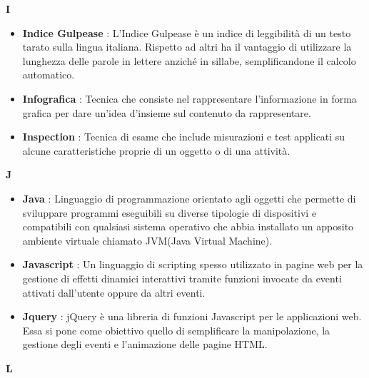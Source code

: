 \newpage
{\huge \textbf{I}}
\begin{flushleft}
\begin{itemize}[label={}]
\item \textbf{Indice Gulpease} : L'Indice Gulpease è un indice di leggibilità di un testo tarato sulla lingua italiana. Rispetto ad altri ha il vantaggio di utilizzare la lunghezza delle parole in lettere anziché in sillabe, semplificandone il calcolo automatico.
\item \textbf{Infografica} : Tecnica che consiste nel rappresentare l'informazione in forma grafica per dare un'idea d'insieme sul contenuto da rappresentare.
\item \textbf{Inspection} : Tecnica di esame che include misurazioni e test applicati su alcune caratteristiche proprie di un oggetto o di una attività.
\end{itemize}
\end{flushleft}
\newpage
{\huge \textbf{J}}
\begin{flushleft}
\begin{itemize}[label={}]
\item \textbf{Java} : Linguaggio di programmazione orientato agli oggetti che permette di sviluppare programmi eseguibili su diverse tipologie di dispositivi e compatibili con qualsiasi sistema operativo che abbia installato un apposito ambiente virtuale chiamato JVM(Java Virtual Machine).
\item \textbf{Javascript} : Un linguaggio di scripting spesso utilizzato in pagine web per la gestione di effetti dinamici interattivi tramite funzioni invocate da eventi attivati dall'utente oppure da altri eventi.
\item \textbf{Jquery} : jQuery è una libreria di funzioni Javascript per le applicazioni web. Essa si pone come obiettivo quello di semplificare la manipolazione, la gestione degli eventi e l'animazione delle pagine HTML.
\end{itemize}
\end{flushleft}
\newpage
{\huge \textbf{L}}
